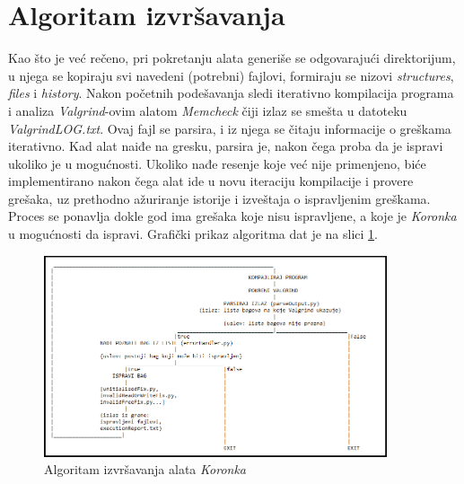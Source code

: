 \documentclass[12pt,oneside]{memoir}
\theoremstyle{plain}
\theoremstyle{definition}
\begin{document}
\section{Algoritam izvršavanja}\label{algoritam}
Kao što je već rečeno, pri pokretanju alata generiše se odgovarajući direktorijum, u njega se kopiraju svi navedeni (potrebni) fajlovi, formiraju se nizovi \textit{structures}, \textit{files} i \textit{history}. Nakon početnih podešavanja sledi iterativno kompilacija programa i analiza \textit{Valgrind}-ovim alatom \textit{Memcheck} čiji izlaz se smešta u datoteku \textit{ValgrindLOG.txt}. Ovaj fajl se parsira, i iz njega se čitaju informacije o greškama iterativno. Kad alat naiđe na gresku, parsira je, nakon čega proba da je ispravi ukoliko je u mogućnosti. Ukoliko nađe resenje koje već nije primenjeno, biće implementirano nakon čega alat ide u novu iteraciju kompilacije i provere grešaka, uz prethodno ažuriranje istorije i izveštaja o ispravljenim greškama. Proces se ponavlja dokle god ima grešaka koje nisu ispravljene, a koje je \textit{Koronka} u mogućnosti da ispravi. Grafički prikaz algoritma dat je na slici \ref{fig:slika4.4}.

\begin{figure}[!ht]
  \centering
  \includegraphics[width=0.9\textwidth]{ExecutingAlgorithm.png}
  \caption{Algoritam izvršavanja alata \textit{Koronka}}
  \label{fig:slika4.4}
\end{figure}
\end{document}
